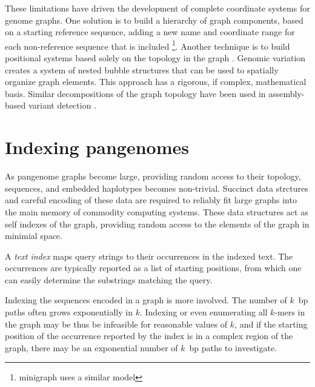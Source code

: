 These limitations have driven the development of complete coordinate systems for genome graphs.
One solution is to build a hierarchy of graph components, based on a starting reference sequence, adding a new name and coordinate range for each non-reference sequence that is included \cite{Rand_2017}\footnote{minigraph uses a similar model}.
Another technique is to build positional systems based solely on the topology in the graph \cite{paten2018superbubbles}.
Genomic variation creates a system of nested bubble structures that can be used to spatially organize graph elements.
This approach has a rigorous, if complex, mathematical basis.
Similar decompositions of the graph topology have been used in assembly-based variant detection \cite{Iqbal_2012, Onodera_2013}.


\section{Indexing pangenomes} %

As pangenome graphs become large, providing random access to their topology, sequences, and embedded haplotypes becomes non-trivial.
Succinct data strctures and careful encoding of these data are required to reliably fit large graphs into the main memory of commodity computing systems.
These data structures act as self indexes of the graph, providing random access to the elements of the graph in minimial space.

A \emph{text index} maps query strings to their occurrences in the indexed text.
The occurrences are typically reported as a list of starting positions, from which one can easily determine the substrings matching the query.

Indexing the sequences encoded in a graph is more involved.
The number of $k$~bp paths often grows exponentially in $k$.
Indexing or even enumerating all $k$-mers in the graph may be thus be infeasible for reasonable values of $k$, and if the starting position of the occurrence reported by the index is in a complex region of the graph, there may be an exponential number of $k$~bp paths to investigate.

